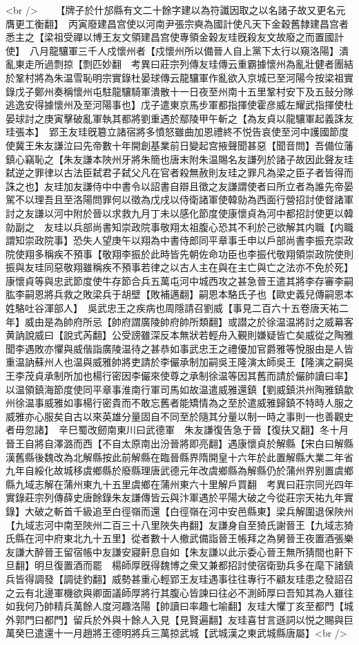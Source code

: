 <br />
　　【牌子於什邡縣有文二十餘字建以為符讖因取之以名諸子故又更名元膺更工衡翻】　丙寅廢建昌宫使以河南尹張宗奭為國計使凡天下金穀舊隸建昌宫者悉主之【梁祖受禪以博王友文領建昌宫使專領金穀友珪旣殺友文故廢之而置國計使】　八月龍驤軍三千人戍懷州者【戍懷州所以備晉人自上黨下太行以窺洛陽】潰亂東走所過剽掠【剽匹妙翻　考異曰莊宗列傳友珪傳云重霸據懷州為亂壯健者團結於鞏村將為朱温雪恥明宗實錄杜晏球傳云龍驤軍作亂欲入京城已至河陽今按梁祖實錄戊子鄭州奏稱懷州屯駐龍驤騎軍潰散十一日夜至州南十五里鞏村安下及五鼔分隊逃逸安得據懷州及至河陽事也】戊子遣東京馬步軍都指揮使霍彦威左耀武指揮使杜晏球討之庚寅擊破亂軍執其都將劉重遇於鄢陵甲午斬之【為友貞以龍驤軍起義誅友珪張本】　郢王友珪旣簒立諸宿將多憤怒雖曲加恩禮終不悦告哀使至河中護國節度使冀王朱友謙泣曰先帝數十年開創基業前日變起宫掖聲聞甚惡【聞音問】吾備位藩鎮心竊恥之【朱友謙本陜州牙將朱簡也唐末附朱温賜名友謙列於諸子故因此聲友珪弑逆之罪律以古法臣弑君子弑父凡在官者殺無赦則友珪之罪凡為梁之臣子者皆得而誅之也】友珪加友謙侍中中書令以詔書自辯且徵之友謙謂使者曰所立者為誰先帝晏駕不以理吾且至洛陽問罪何以徵為戊戌以侍衛諸軍使韓勍為西面行營招討使督諸軍討之友謙以河中附於晉以求救九月丁未以感化節度使康懷貞為河中都招討使更以韓勍副之　友珪以兵部尚書知崇政院事敬翔太祖腹心恐其不利於己欲解其内職【内職謂知崇政院事】恐失人望庚午以翔為中書侍郎同平章事壬申以戶部尚書李振充崇政院使翔多稱疾不預事【敬翔李振於此時皆先朝佐命功臣也李振代敬翔領崇政院使則振與友珪同惡敬翔雖稱疾不預事若律之以古人主在與在主亡與亡之法亦不免於死】　康懷貞等與忠武節度使牛存節合兵五萬屯河中城西攻之甚急晉王遣其將李存審李嗣肱李嗣恩將兵救之敗梁兵于胡壁【敗補邁翻】嗣恩本駱氏子也【歐史義兒傳嗣恩本姓駱吐谷渾部人】　吳武忠王之疾病也周隱請召劉威【事見二百六十五卷唐天祐二年】威由是為帥府所忌【帥府謂廣陵帥府帥所類翻】或譛之於徐温温將討之威幕客黄訥說威曰【說式芮翻】公受謗雖深反本無狀若輕舟入覲則嫌疑皆亡矣威從之陶雅聞李遇敗亦懼與威偕詣廣陵温待之甚恭如事武忠王之禮優加官爵雅等悅服由是人皆重温訥蘇州人也温與威雅帥將吏請於李儼承制加嗣吳王隆演太師吳王【隆演之嗣吳王李茂貞承制所加也楊行密因李儼來使尊之承制徐温等因其舊而請於儼帥讀曰率】以温領鎮海節度使同平章事淮南行軍司馬如故温遣威雅還鎮【劉威鎮洪州陶雅鎮歙州徐温事威雅如事楊行密貴而不敢忘舊者能矯情為之至於遣威雅歸鎮不特時人服之威雅亦心服矣自古以來英雄分量固自不同至於隨其分量以制一時之事則一也善觀史者毋忽諸】　辛巳蜀改劒南東川曰武德軍　朱友謙復告急于晉【復扶又翻】冬十月晉王自將自澤潞而西【不自太原南出汾晉將即亮翻】遇康懷貞於解縣【宋白曰解縣漢舊縣後魏改為北解縣按此前解縣在臨晉縣界隋開皇十六年於此置解縣大業二年省九年自綏化故城移虞鄉縣於廢縣理唐武德元年改虞鄉縣為解縣仍於蒲州界别置虞鄉縣九域志解在蒲州東九十五里虞鄉在蒲州東六十里解戶買翻　考異曰莊宗同光四年實錄莊宗列傳薛史唐餘錄朱友謙傳皆云與汴軍遇於平陽大破之今從莊宗天祐九年實錄】大破之斬首千級追至白徑嶺而還【白徑嶺在河中安邑縣東】梁兵解圍退保陜州【九域志河中南至陜州二百三十八里陜失冉翻】友謙身自至猗氏謝晉王【九域志猗氏縣在河中府東北九十五里】從者數十人撤武備詣晉王帳拜之為舅晉王夜置酒張樂友謙大醉晉王留宿帳中友謙安寢鼾息自如【朱友謙以此示委心晉王無所猜間也鼾下旦翻】明旦復置酒而罷　楊師厚旣得魏博之衆又兼都招討使宿衛勁兵多在麾下諸鎮兵皆得調發【調徒釣翻】威勢甚重心輕郢王友珪遇事往往專行不顧友珪患之發詔召之云有北邊軍機欲與卿面議師厚將行其腹心皆諫曰往必不測師厚曰吾知其為人雖往如我何乃帥精兵萬餘人度河趣洛陽【帥讀曰率趣七喻翻】友珪大懼丁亥至都門【城外郭門曰都門】留兵於外與十餘人入見【見賢遍翻】友珪喜甘言遜詞以悦之賜與巨萬癸巳遣還十一月趙將王德明將兵三萬掠武城【武城漢之東武城縣唐屬】<br />
